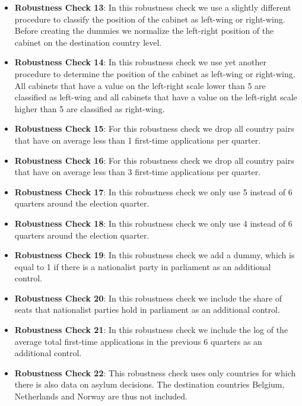 \documentclass[11pt,a4paper]{scrartcl}
\begin{document}
\begin{itemize}
	\item \textbf{Robustness Check 13}:  In this robustness check we use a slightly different procedure to classify the position of the cabinet as left-wing or right-wing. Before creating the dummies we normalize the left-right position of the cabinet on the destination country level.
	
	\item \textbf{Robustness Check 14}: In this robustness check we use yet another procedure to determine the position of the cabinet as left-wing or right-wing. All cabinets that have a value on the left-right scale lower than 5 are classified as left-wing and all cabinets that have a value on the left-right scale higher than 5 are classified as right-wing.
	
	\item \textbf{Robustness Check 15}: For this robustness check we drop all country pairs that have on average less than 1 first-time applications per quarter. 
	
	\item \textbf{Robustness Check 16}: For this robustness check we drop all country pairs that have on average less than 3 first-time applications per quarter. 
	
	\item \textbf{Robustness Check 17}: In this robustness check we only use 5 instead of 6 quarters around the election quarter. 
	
	\item \textbf{Robustness Check 18}: In this robustness check we only use 4 instead of 6 quarters around the election quarter. 
	
	\item \textbf{Robustness Check 19}: In this robustness check we add a dummy, which is equal to 1 if there is a nationalist party in parliament as an additional control. 
	
	\item \textbf{Robustness Check 20}: In this robustness check we include the share of seats that nationalist parties hold in parliament as an additional control. 
	
	\item \textbf{Robustness Check 21}: In this robustness check we include the log of the average total first-time applications in the previous 6 quarters as an additional control.  

	\item \textbf{Robustness Check 22}: This robustness check uses only countries for which there is also data on asylum decisions. The destination countries Belgium, Netherlands and Norway are thus not included.
	
\end{itemize}
\end{document}
